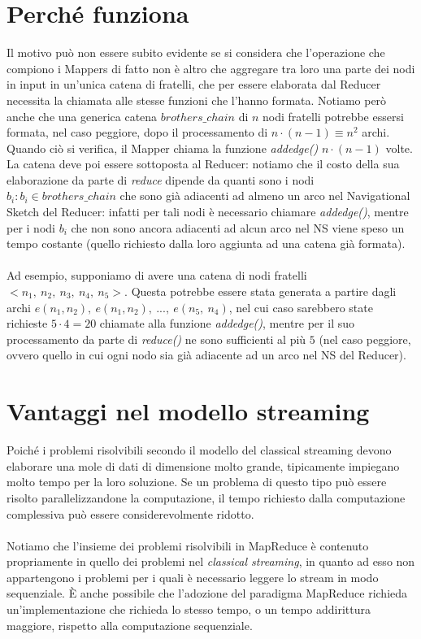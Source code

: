 \documentclass[a4paper,11pt]{report}
\begin{document}
\section{Perché funziona}
Il motivo può non essere subito evidente se si considera che l'operazione che compiono i Mappers di fatto non è altro che aggregare tra loro
una parte dei 
nodi in input in un'unica catena di fratelli, che per essere elaborata dal Reducer necessita la chiamata alle stesse funzioni che l'hanno
formata.
Notiamo però anche che una generica catena $brothers\_chain$ di $n$ nodi fratelli potrebbe essersi formata, nel caso peggiore, dopo il
processamento di $n \cdot(n-1)\equiv n^2$ archi.
Quando ciò si verifica, il Mapper chiama la funzione \emph{add\textunderscore edge()} $n \cdot (n-1)$ volte. La catena deve poi essere
sottoposta al Reducer:
notiamo che il costo della sua elaborazione da parte di \emph{reduce} dipende da quanti sono i nodi $b_i:b_i\in brothers\_chain$ che sono
già adiacenti ad almeno un arco nel 
Navigational Sketch del Reducer: infatti per tali nodi è necessario chiamare \emph{add\textunderscore edge()}, mentre per i nodi $b_i$ che
non sono ancora adiacenti ad alcun arco 
nel NS viene speso un tempo costante (quello richiesto dalla loro aggiunta ad una catena già formata).
\paragraph{}
Ad esempio, supponiamo di avere una catena di nodi fratelli $<n_1,\ n_2,\ n_3,\ n_4,\ n_5>$. Questa potrebbe essere stata generata a partire
dagli archi $e(n_1,n_2),\ e(n_1,n_2),\ ...,\ e(n_5,\ n_4) $,
nel cui caso sarebbero state richieste $5 \cdot 4=20$ chiamate alla funzione \emph{add\textunderscore edge()}, mentre per il suo
processamento da parte di \emph{reduce()} ne sono sufficienti al 
più $5$ (nel caso peggiore, ovvero quello in cui ogni nodo sia già adiacente ad un arco nel NS del Reducer). 

\section{Vantaggi nel modello streaming}
Poiché i problemi risolvibili secondo il modello del classical streaming devono elaborare una mole di dati di dimensione molto grande,
tipicamente impiegano molto
tempo per la loro soluzione. 
Se un problema di questo tipo può essere risolto parallelizzandone la computazione, il tempo richiesto dalla computazione complessiva può
essere considerevolmente ridotto.
\paragraph{}
Notiamo che l'insieme dei problemi risolvibili in MapReduce è contenuto propriamente in quello dei problemi nel \emph{classical streaming},
in quanto ad esso non appartengono i problemi per i quali è necessario leggere lo stream in modo sequenziale.
È anche possibile che l'adozione del paradigma MapReduce richieda un'implementazione che richieda lo stesso tempo, o un tempo addirittura
maggiore, rispetto alla computazione sequenziale.
\end{document}
